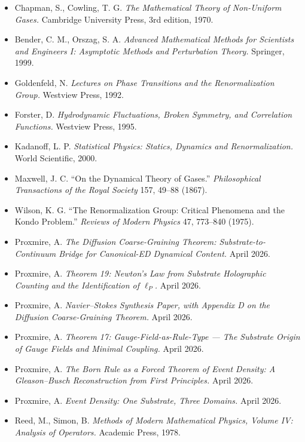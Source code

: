 \documentclass[11pt,a4paper]{article}
\begin{document}
\begin{itemize}[leftmargin=*,itemsep=2pt]
  \item Chapman, S., Cowling, T. G. \emph{The Mathematical Theory of Non-Uniform Gases.} Cambridge University Press, 3rd edition, 1970.
  \item Bender, C. M., Orszag, S. A. \emph{Advanced Mathematical Methods for Scientists and Engineers I: Asymptotic Methods and Perturbation Theory.} Springer, 1999.
  \item Goldenfeld, N. \emph{Lectures on Phase Transitions and the Renormalization Group.} Westview Press, 1992.
  \item Forster, D. \emph{Hydrodynamic Fluctuations, Broken Symmetry, and Correlation Functions.} Westview Press, 1995.
  \item Kadanoff, L. P. \emph{Statistical Physics: Statics, Dynamics and Renormalization.} World Scientific, 2000.
  \item Maxwell, J. C. ``On the Dynamical Theory of Gases.'' \emph{Philosophical Transactions of the Royal Society} 157, 49--88 (1867).
  \item Wilson, K. G. ``The Renormalization Group: Critical Phenomena and the Kondo Problem.'' \emph{Reviews of Modern Physics} 47, 773--840 (1975).
  \item Proxmire, A. \emph{The Diffusion Coarse-Graining Theorem: Substrate-to-Continuum Bridge for Canonical-ED Dynamical Content.} April 2026.
  \item Proxmire, A. \emph{Theorem 19: Newton's Law from Substrate Holographic Counting and the Identification of $\ell_P$.} April 2026.
  \item Proxmire, A. \emph{Navier--Stokes Synthesis Paper, with Appendix D on the Diffusion Coarse-Graining Theorem.} April 2026.
  \item Proxmire, A. \emph{Theorem 17: Gauge-Field-as-Rule-Type --- The Substrate Origin of Gauge Fields and Minimal Coupling.} April 2026.
  \item Proxmire, A. \emph{The Born Rule as a Forced Theorem of Event Density: A Gleason--Busch Reconstruction from First Principles.} April 2026.
  \item Proxmire, A. \emph{Event Density: One Substrate, Three Domains.} April 2026.
  \item Reed, M., Simon, B. \emph{Methods of Modern Mathematical Physics, Volume IV: Analysis of Operators.} Academic Press, 1978.
\end{itemize}
\end{document}
